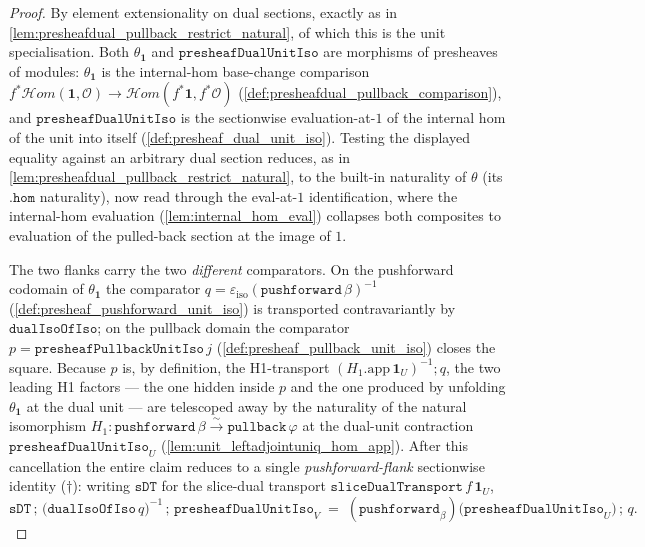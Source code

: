 \begin{proof}
  \leanok
  By element extensionality on dual sections, exactly as in
  \cref{lem:presheafdual_pullback_restrict_natural}, of which this is the unit specialisation. Both
  \(\theta_{\mathbf 1}\) and \(\mathtt{presheafDualUnitIso}\) are morphisms of presheaves of modules:
  \(\theta_{\mathbf 1}\) is the internal-hom base-change comparison
  \(f^{*}\mathcal{H}om(\mathbf 1, \mathcal{O}) \to \mathcal{H}om(f^{*}\mathbf 1, f^{*}\mathcal{O})\)
  (\cref{def:presheafdual_pullback_comparison}), and \(\mathtt{presheafDualUnitIso}\) is the
  sectionwise evaluation-at-\(1\) of the internal hom of the unit into itself
  (\cref{def:presheaf_dual_unit_iso}). Testing the displayed equality against an arbitrary dual
  section reduces, as in \cref{lem:presheafdual_pullback_restrict_natural}, to the built-in
  naturality of \(\theta\) (its \(\mathtt{.hom}\) naturality), now read through the eval-at-\(1\)
  identification, where the internal-hom evaluation (\cref{lem:internal_hom_eval}) collapses both
  composites to evaluation of the pulled-back section at the image of \(1\).

  The two flanks carry the two \emph{different} comparators. On the pushforward codomain of
  \(\theta_{\mathbf 1}\) the comparator \(q = \varepsilon_{\mathrm{iso}}(\mathtt{pushforward}\,
  \beta)^{-1}\) (\cref{def:presheaf_pushforward_unit_iso}) is transported contravariantly by
  \(\mathtt{dualIsoOfIso}\); on the pullback domain the comparator
  \(p = \mathtt{presheafPullbackUnitIso}\,j\) (\cref{def:presheaf_pullback_unit_iso}) closes the
  square. Because \(p\) is, by definition, the H1-transport \((H_1.\mathrm{app}\,\mathbf 1_U)^{-1}
  \mathbin{;} q\), the two leading H1 factors --- the one hidden inside \(p\) and the one produced by
  unfolding \(\theta_{\mathbf 1}\) at the dual unit --- are telescoped away by the naturality of the
  natural isomorphism \(H_1 : \mathtt{pushforward}\,\beta \xrightarrow{\sim} \mathtt{pullback}\,
  \varphi\) at the dual-unit contraction \(\mathtt{presheafDualUnitIso}_U\)
  (\cref{lem:unit_leftadjointuniq_hom_app}). After this cancellation the entire claim reduces to a
  single \emph{pushforward-flank} sectionwise identity ($\dagger$): writing \(\mathtt{sDT}\) for the
  slice-dual transport \(\mathtt{sliceDualTransport}\,f\,\mathbf 1_U\),
  \[
    \mathtt{sDT}
      \,\mathbin{;}\, \bigl(\mathtt{dualIsoOfIso}\,q\bigr)^{-1}
      \,\mathbin{;}\, \mathtt{presheafDualUnitIso}_V
    \;=\;
    (\mathtt{pushforward}_\beta)\bigl(\mathtt{presheafDualUnitIso}_U\bigr)
      \,\mathbin{;}\, q .
  \]


\end{proof}
